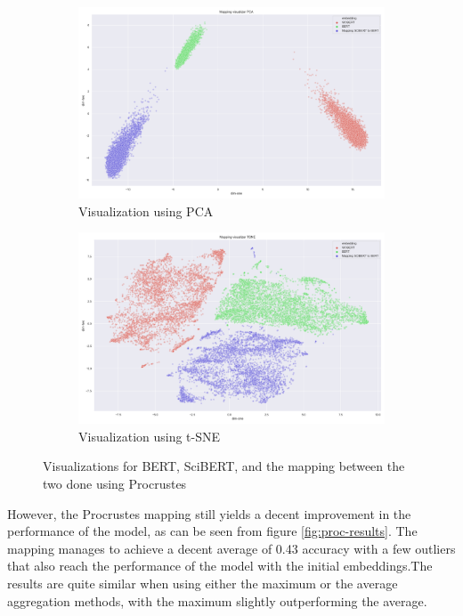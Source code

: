 \documentclass[12pt]{extreport}
\begin{document}
\begin{figure}[H]
\centering
\begin{subfigure}{.49\textwidth}
\centering
\includegraphics[width=\linewidth]{assets/addressing-change/mapping_vis_pca_SCIBERT_BERT_average.png}
\caption{Visualization using PCA}
\label{fig:proc-pca}
\end{subfigure}
\begin{subfigure}{.49\textwidth}
\centering
\includegraphics[width=\linewidth]{assets/addressing-change/mapping_vis_tsne_SCIBERT_BERT_average.png}
\caption{Visualization using t-SNE}
\label{fig:proc-tsne}
\end{subfigure}
\caption{Visualizations for BERT, SciBERT, and the mapping between the two done using Procrustes}
\label{fig:proc-viz}
\end{figure}

However, the Procrustes mapping still yields a decent improvement in the performance of the model, as can be seen from figure \ref{fig:proc-results}. The mapping manages to achieve a decent average of 0.43 accuracy with a few outliers that also reach the performance of the model with the initial embeddings.The results are quite similar when using either the maximum or the average aggregation methods, with the maximum slightly outperforming the average.
\end{document}
